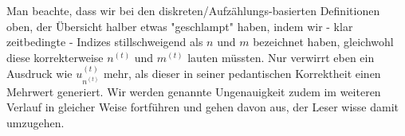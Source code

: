 \vspace{0.6cm}

Man beachte, dass wir bei den diskreten/Aufzählungs-basierten Definitionen oben, der Übersicht halber etwas "geschlampt" haben, indem wir - klar zeitbedingte - Indizes stillschweigend als $n$ und $m$ bezeichnet haben, gleichwohl diese korrekterweise $n^{(t)}$ und $m^{(t)}$ lauten müssten. Nur verwirrt eben ein Ausdruck wie $u^{(t)}_{n^{(t)}}$ mehr, als dieser in seiner pedantischen Korrektheit einen Mehrwert generiert. Wir werden genannte Ungenauigkeit zudem im weiteren Verlauf in gleicher Weise fortführen und gehen davon aus, der Leser wisse damit umzugehen. 

\vspace{0.3cm}


